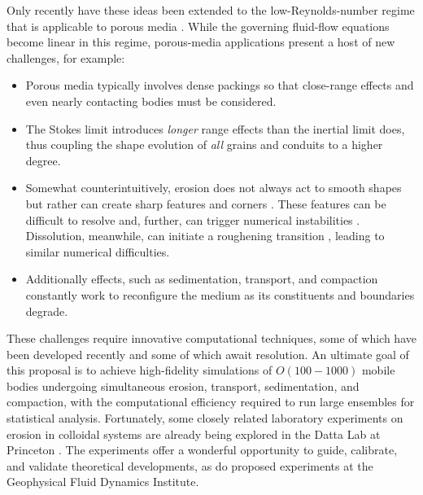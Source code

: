 \documentclass[11pt]{article}
\begin{document}
Only recently have these ideas been extended to the low-Reynolds-number regime that is applicable to porous media  \cite{mitchell2017generalized, Quaife2018}. While the governing fluid-flow equations become linear in this regime, porous-media applications present a host of new challenges, for example:
\begin{itemize}
\item Porous media typically involves dense packings so that close-range effects and even nearly contacting bodies must be considered.
\item The Stokes limit introduces {\em longer} range effects than the inertial limit does, thus coupling the shape evolution of {\em all} grains and conduits to a higher degree.
\item Somewhat counterintuitively, erosion does not always act to smooth shapes but rather can create sharp features and corners \cite{Ristroph2012}. These features can be difficult to resolve and, further, can trigger numerical instabilities \cite{Quaife2018}. Dissolution, meanwhile, can initiate a roughening transition \cite{claudin2017dissolution}, leading to similar numerical difficulties.
\item Additionally effects, such as sedimentation, transport, and compaction constantly work to reconfigure the medium as its constituents and boundaries degrade.
\end{itemize}
These challenges require innovative computational techniques, some of which have been developed recently \cite{Quaife2018} and some of which await resolution. An ultimate goal of this proposal is to achieve high-fidelity simulations of $O(100-1000)$ mobile bodies undergoing simultaneous erosion, transport, sedimentation, and compaction, with the computational efficiency required to run large ensembles for statistical analysis.
Fortunately, some closely related laboratory experiments on erosion in colloidal systems are already being explored in the Datta Lab at Princeton \cite{bizmark2019multiscale}. The experiments offer a wonderful opportunity to guide, calibrate, and validate theoretical developments, as do proposed experiments at the Geophysical Fluid Dynamics Institute.
\end{document}

